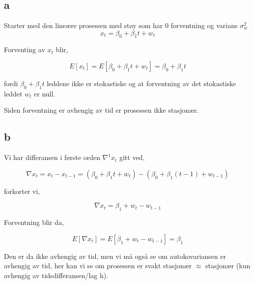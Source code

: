 \documentclass[12pt]{article}
\begin{document}
{%
\section{}
\subsection{a}

Starter med den lineære prosessen med støy som har 0 forventning og varians $\sigma_{w}^2$
\begin{equation}
  x_{t} = \beta_{0} + \beta_{1}t + w_{t}
\end{equation}


Forventing av $x_{t}$ blir,

\begin{equation*}
  E[x_{t}] = E[\beta_{0} + \beta_{1}t + w_{t}] = \beta_{0} + \beta_{1}t
\end{equation*}

fordi $\beta_{0} + \beta_{1}t$ leddene ikke er stokastiske og at forventning av det stokastiske leddet $w_{t}$ er null.

Siden forventning er avhengig av tid er prosessen ikke stasjonær.

\subsection{b}

Vi har differansen i første orden $\nabla ^1 x_{t}$ gitt ved,

\begin{equation*}
  \nabla x_{t} = x_{t} -  x_{t - 1} = (\beta_{0} + \beta_{1}t + w_{t}) - (\beta_{0} + \beta_{1}(t-1) + w_{t-1})
\end{equation*}

forkorter vi,

\begin{equation*}
  \nabla x_{t} = \beta_{1} + w_{t} - w_{t-1}
\end{equation*}


Forventning blir da,

\begin{equation*}
  E[\nabla x_{t}] = E[\beta_{1} + w_{t} - w_{t-1}] = \beta_{1}
\end{equation*}

Den er da ikke avhengig av tid, men vi må også se om autokovariansen er avhengig av tid, her kan vi se om prosessen er svakt stasjonær $\approx$ stasjonær (kun avhengig av tidsdifferansen/lag h).


}
\end{document}
